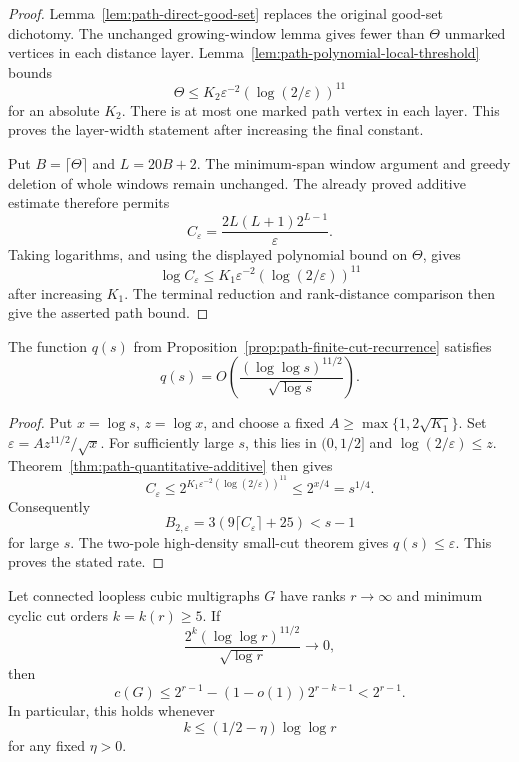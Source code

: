\begin{proof}
Lemma~\ref{lem:path-direct-good-set} replaces the original good-set dichotomy.
The unchanged growing-window lemma gives fewer than $\Theta$ unmarked vertices in each distance layer.
Lemma~\ref{lem:path-polynomial-local-threshold} bounds
\[
 \Theta\le K_2\varepsilon^{-2}(\log(2/\varepsilon))^{11}
\]
for an absolute $K_2$.
There is at most one marked path vertex in each layer.
This proves the layer-width statement after increasing the final constant.

Put $B=\lceil\Theta\rceil$ and $L=20B+2$.
The minimum-span window argument and greedy deletion of whole windows remain unchanged.
The already proved additive estimate therefore permits
\[
 C_\varepsilon=\frac{2L(L+1)2^{L-1}}{\varepsilon}.
\]
Taking logarithms, and using the displayed polynomial bound on $\Theta$, gives
\[
 \log C_\varepsilon
 \le K_1\varepsilon^{-2}(\log(2/\varepsilon))^{11}
\]
after increasing $K_1$.
The terminal reduction and rank-distance comparison then give the asserted path bound.
\end{proof}

\begin{corollary}
\label{cor:path-logarithmic-deletion-excess}
The function $q(s)$ from Proposition~\ref{prop:path-finite-cut-recurrence} satisfies
\[
 q(s)=O\!\left(\frac{(\log\log s)^{11/2}}{\sqrt{\log s}}\right).
\]
\end{corollary}

\begin{proof}
Put $x=\log s$, $z=\log x$, and choose a fixed $A\ge\max\{1,2\sqrt{K_1}\}$.
Set $\varepsilon=A z^{11/2}/\sqrt x$.
For sufficiently large $s$, this lies in $(0,1/2]$ and $\log(2/\varepsilon)\le z$.
Theorem~\ref{thm:path-quantitative-additive} then gives
\[
 C_\varepsilon
 \le2^{K_1\varepsilon^{-2}(\log(2/\varepsilon))^{11}}
 \le2^{x/4}=s^{1/4}.
\]
Consequently
\[
 B_{2,\varepsilon}=3(9\lceil C_\varepsilon\rceil+25)<s-1
\]
for large $s$.
The two-pole high-density small-cut theorem gives $q(s)\le\varepsilon$.
This proves the stated rate.
\end{proof}

\begin{corollary}
\label{cor:path-loglog-growing-cut}
Let connected loopless cubic multigraphs $G$ have ranks $r\to\infty$ and minimum cyclic cut orders $k=k(r)\ge5$.
If
\[
 \frac{2^k(\log\log r)^{11/2}}{\sqrt{\log r}}\longrightarrow0,
\]
then
\[
 c(G)\le2^{r-1}-(1-o(1))2^{r-k-1}<2^{r-1}.
\]
In particular, this holds whenever
\[
 k\le(1/2-\eta)\log\log r
\]
for any fixed $\eta>0$.
\end{corollary}

